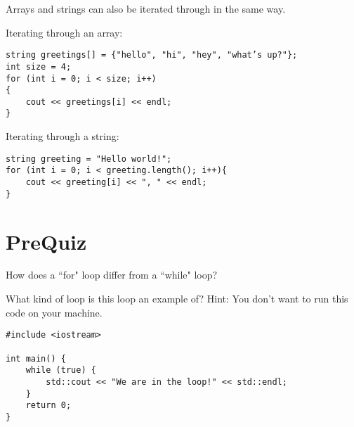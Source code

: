 Arrays and strings can also be iterated through in the same way.

\begin{example}
    Iterating through an array:
    \begin{verbatim}
string greetings[] = {"hello", "hi", "hey", "what’s up?"};
int size = 4;
for (int i = 0; i < size; i++)
{
    cout << greetings[i] << endl;
}
    \end{verbatim}

    Iterating through a string:
    \begin{verbatim}
string greeting = "Hello world!";
for (int i = 0; i < greeting.length(); i++){
    cout << greeting[i] << ", " << endl;
}
    \end{verbatim}
\end{example}

\section{PreQuiz}

\begin{problem}
    How does a ``for" loop differ from a ``while" loop?
\end{problem}

\begin{problem}
What kind of loop is this loop an example of? Hint: You don't want to run this code on your machine.
\begin{verbatim}
#include <iostream>

int main() {
    while (true) {
        std::cout << "We are in the loop!" << std::endl;
    }
    return 0;
}
\end{verbatim}
\end{problem}

